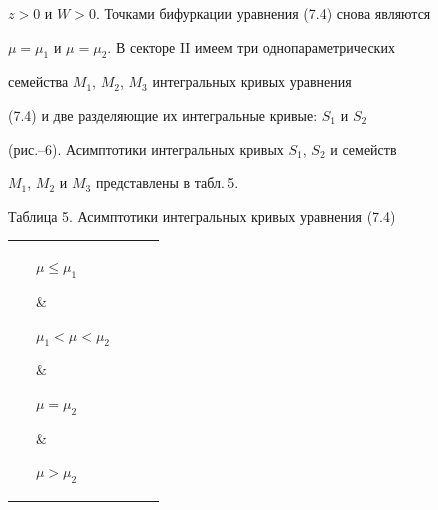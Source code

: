 $z>0$ и $W>0$. Точками бифуркации уравнения (7.4) снова являются  


$\mu=\mu_1$ и $\mu=\mu_2$. В секторе II имеем три однопараметрических  


семейства $M_1$, $M_2$, $M_3$ интегральных кривых уравнения 


(7.4) и две разделяющие их интегральные кривые: $S_1$ и $S_2$ 


(рис.--6). Асимптотики интегральных кривых $S_1$, $S_2$ и семейств 


$M_1$, $M_2$ и $M_3$ представлены в табл.\,5. 


 





 


\begin{center} 


Таблица 5. Асимптотики интегральных кривых уравнения (7.4) 


\begin{tabular}{|p{0.7cm}|p{3.4cm}|p{3.4cm}|p{3.4cm}|p{3.4cm}|} 


\hline 


\ & \parbox{3.3cm}{\qquad $\mu\le\mu_1$} & 


\parbox{3.3cm}{\quad $\mu_1<\mu<\mu_2$} & 


\parbox{3.3cm}{\qquad $\mu=\mu_2$} & 


\parbox{3.3cm}{\qquad $\mu>\mu_2$} \\ 


\hline 


$S_1$ & \parbox{3.3cm}{$y\sim d_3z^\chi$, $z\to0$; 


$y\sim R^+_1(d_2)$, $z\to z_1+0$, $y\sim y_1+0$} & 


\parbox{3.3cm}{} & \parbox{3.3cm}{} & 


\parbox{3.3cm}{$y\sim k_1z$, $z\to0$;\\ $y\sim k_2z$, 


$z\to\infty$}\\ 


\hline 


$S_2$ & \parbox{3.3cm}{$y\sim R^+_2(d_2)$, $z\to z_2+0$, 


$y\to y_2+0$, $z_2>z_1$; $y\sim k_2z$, $z\to \infty$} & 


\parbox{3.3cm}{$y\sim R^+_2(d_2)$, $z\to z_2+0$, 


$y\to y_2+0$, $z_2>z_1$; $y\sim k_2z$, $z\to\infty$} & 



\end{tabular}
\end{center}
